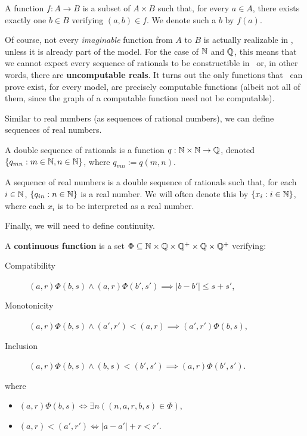 \documentclass[../main.tex]{memoir}
\begin{document}
\begin{definition}
  \label{def:function}
  A function $f:A \to B$ is a subset of $A \times B$ such that, for every $a \in A$, there exists exactly one $b \in B$ verifying $(a, b) \in f$. We denote such a $b$ by $f(a)$.
\end{definition}

Of course, not every \textit{imaginable} function from $A$ to $B$ is actually realizable in \rca, unless it is already part of the model. For the case of $\mathbb{N}$ and $\mathbb{Q}$, this means that we cannot expect every sequence of rationals to be constructible in \rca\ or, in other words, there are \textbf{uncomputable reals}. It turns out the only functions that \rca\ can prove exist, for every model, are precisely computable functions (albeit not all of them, since the graph of a computable function need not be computable).

Similar to real numbers (as sequences of rational numbers), we can define sequences of real numbers.

\begin{definition}
  A double sequence of rationals is a function $q:\mathbb{N} \times \mathbb{N} \to \mathbb{Q}$, denoted $\{q_{mn}: m \in \mathbb{N}, n \in \mathbb{N}\}$, where $q_{mn} := q(m, n)$.

  A sequence of real numbers is a double sequence of rationals such that, for each $i \in \mathbb{N}$, $\{q_{in}: n \in \mathbb{N}\}$ is a real number. We will often denote this by $\{x_i: i \in \mathbb{N}\}$, where each $x_i$ is to be interpreted as a real number.
\end{definition}

Finally, we will need to define continuity.

\begin{definition}
  \label{def:continuous-function-rca}
  A \textbf{continuous function} is a set $\Phi \subseteq \mathbb{N} \times \mathbb{Q} \times \mathbb{Q}^+ \times \mathbb{Q} \times \mathbb{Q}^+$ verifying:

  \begin{description}
  \item[Compatibility] $(a, r)\Phi(b, s) \land (a, r)\Phi(b', s') \implies |b - b'| \le s + s'$,
  \item[Monotonicity] $(a, r)\Phi(b, s) \land (a', r') < (a, r) \implies (a', r')\Phi(b, s)$,
  \item[Inclusion] $(a, r)\Phi(b, s) \land (b, s) < (b', s') \implies (a, r)\Phi(b', s')$.
  \end{description}

  where

  \begin{itemize}
  \item $(a, r)\Phi(b, s) \iff \exists n ((n, a, r, b, s) \in \Phi)$,
  \item $(a, r) < (a', r') \iff |a - a'| + r < r'$.
  \end{itemize}
\end{definition}
\end{document}

